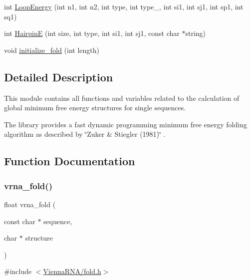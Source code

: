 \begin{DoxyCompactItemize}
\item 
int \hyperlink{group__mfe__fold__single_ga2163034a25c6115d894b199e97e03f6c}{Loop\+Energy} (int n1, int n2, int type, int type\+\_, int si1, int sj1, int sp1, int sq1)
\item 
int \hyperlink{group__mfe__fold__single_gab327ce11972f5ac069d52c8dedfdb700}{HairpinE} (int size, int type, int si1, int sj1, const char $\ast$string)
\item 
void \hyperlink{group__mfe__fold__single_gac3f0a28d9cb609d388b155445073fd20}{initialize\+\_\+fold} (int length)
\end{DoxyCompactItemize}


\subsection{Detailed Description}
This module contains all functions and variables related to the calculation of global minimum free energy structures for single sequences. 

The library provides a fast dynamic programming minimum free energy folding algorithm as described by \char`\"{}\+Zuker \& Stiegler (1981)\char`\"{} \cite{zuker:1981}. 

\subsection{Function Documentation}
\mbox{\label{group__mfe__fold__single_ga29a33b2895f4e67b0480271ff289afdc}} 
\subsubsection{\texorpdfstring{vrna\+\_\+fold()}{vrna\_fold()}}
{\footnotesize\ttfamily float vrna\+\_\+fold (\begin{DoxyParamCaption}\item[{const char $\ast$}]{sequence,  }\item[{char $\ast$}]{structure }\end{DoxyParamCaption})}



{\ttfamily \#include $<$\hyperlink{fold_8h}{Vienna\+R\+N\+A/fold.\+h}$>$}



